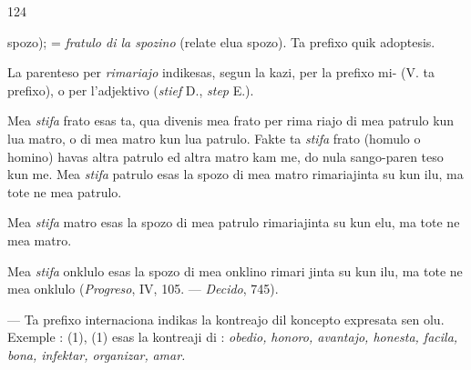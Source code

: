 \begin{VUpage}[128]{124}

\VUcontinue
spozo);  = \textit{fratulo di la spozino} (relate elua spozo).\nl
Ta prefixo quik adoptesis.

La parenteso per \textit{rimariajo} indikesas, segun la kazi, per\nl
la prefixo mi- (V. ta prefixo), o per l'adjektivo \nl
(\textit{stief} D., \textit{step} E.).

Mea \textit{stifa} frato esas ta, qua divenis mea frato per rima\cc
riajo di mea patrulo kun lua matro, o di mea matro kun\nl
lua patrulo. Fakte ta \textit{stifa} frato (homulo o homino) havas\nl
altra patrulo ed altra matro kam me, do nula sango-paren\cc
teso kun me. Mea \textit{stifa} patrulo esas la spozo di mea matro\nl
rimariajinta su kun ilu, ma tote ne mea patrulo.

Mea \textit{stifa} matro esas la spozo di mea patrulo rimariajinta\nl
su kun elu, ma tote ne mea matro.

Mea \textit{stifa} onklulo esas la spozo di mea onklino rimari\cc
jinta su kun ilu, ma tote ne mea onklulo (\textit{Progreso}, IV, 105.\nl
--- \textit{Decido}, 745).

 --- Ta prefixo internaciona indikas la kontreajo dil\nl
koncepto expresata sen olu. Exemple : \nl
{} (1), \nl
{} (1) esas la kontreaji di : \textit{obedio,}\nl
\textit{honoro, avantajo, honesta, facila, bona, infektar, organizar,}\nl
\textit{amar.}


\end{VUpage}

